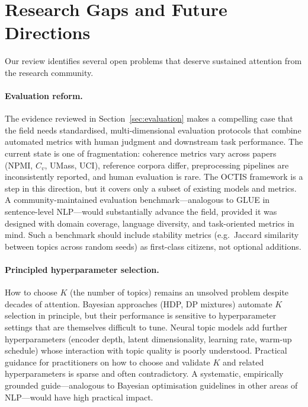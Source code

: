 \documentclass[11pt,a4paper]{article}
\begin{document}
\section{Research Gaps and Future Directions}
\label{sec:future}

Our review identifies several open problems that deserve sustained
attention from the research community.

\paragraph{Evaluation reform.}
The evidence reviewed in Section~\ref{sec:evaluation} makes a
compelling case that the field needs standardised, multi-dimensional
evaluation protocols that combine automated metrics with human
judgment and downstream task performance.
The current state is one of fragmentation: coherence metrics vary
across papers (NPMI, $C_{v}$, UMass, UCI), reference corpora differ,
preprocessing pipelines are inconsistently reported, and human
evaluation is rare.
The OCTIS framework \parencite{terragni2021octis} is a step in this
direction, but it covers only a subset of existing models and metrics.
A community-maintained evaluation benchmark---analogous to GLUE in
sentence-level NLP---would substantially advance the field, provided
it was designed with domain coverage, language diversity, and
task-oriented metrics in mind.
Such a benchmark should include stability metrics (e.g.\ Jaccard
similarity between topics across random seeds) as first-class citizens,
not optional additions.

\paragraph{Principled hyperparameter selection.}
How to choose $K$ (the number of topics) remains an unsolved problem
despite decades of attention.
Bayesian approaches (HDP, DP mixtures) automate $K$ selection in
principle, but their performance is sensitive to hyperparameter
settings that are themselves difficult to tune.
Neural topic models add further hyperparameters (encoder depth, latent
dimensionality, learning rate, warm-up schedule) whose interaction
with topic quality is poorly understood.
Practical guidance for practitioners on how to choose and validate
$K$ and related hyperparameters is sparse and often contradictory.
A systematic, empirically grounded guide---analogous to Bayesian
optimisation guidelines in other areas of NLP---would have high
practical impact.
\end{document}
